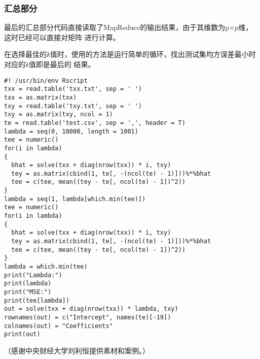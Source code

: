 \subsubsection{汇总部分}\label{ux6c47ux603bux90e8ux5206}

最后的汇总部分代码直接读取了MapReduce的输出结果，由于其维数为p×p维，这时已经可以直接对矩阵
进行计算。

在选择最佳的λ值时，使用的方法是运行简单的循环，找出测试集均方误差最小时对应的λ值即是最后的
结果。

\begin{lstlisting}
#! /usr/bin/env Rscript
txx = read.table('txx.txt', sep = ' ')
txx = as.matrix(txx)
txy = read.table('txy.txt', sep = ' ')
txy = as.matrix(txy, ncol = 1)
te = read.table('test.csv', sep = ',', header = T)
lambda = seq(0, 10000, length = 1001)
tee = numeric()
for(i in lambda)
{
  bhat = solve(txx + diag(nrow(txx)) * i, txy)
  tey = as.matrix(cbind(1, te[, -(ncol(te) - 1)]))%*%bhat
  tee = c(tee, mean((tey - te[, ncol(te) - 1])^2))
}
lambda = seq(1, lambda[which.min(tee)])
tee = numeric()
for(i in lambda)
{
  bhat = solve(txx + diag(nrow(txx)) * i, txy)
  tey = as.matrix(cbind(1, te[, -(ncol(te) - 1)]))%*%bhat
  tee = c(tee, mean((tey - te[, ncol(te) - 1])^2))
}
lambda = which.min(tee)
print("Lambda:")
print(lambda)
print("MSE:")
print(tee[lambda])
out = solve(txx + diag(nrow(txx)) * lambda, txy)
rownames(out) = c("Intercept", names(te)[-19])
colnames(out) = "Coefficients"
print(out)
\end{lstlisting}

（感谢中央财经大学刘利恒提供素材和案例。）

